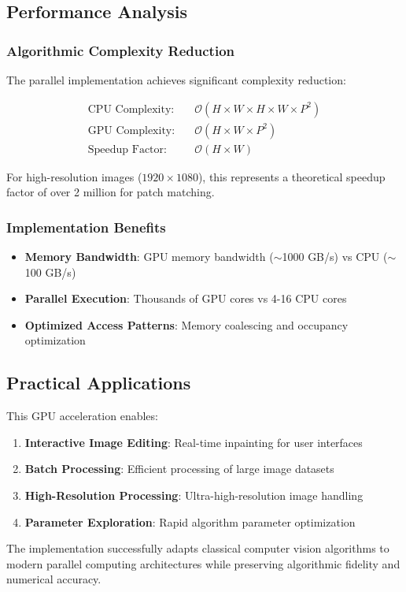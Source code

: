 \documentclass[11pt]{article}
\begin{document}
\subsection{Performance Analysis}

\subsubsection{Algorithmic Complexity Reduction}

The parallel implementation achieves significant complexity reduction:

\begin{align}
\text{CPU Complexity:} &\quad \mathcal{O}(H \times W \times H \times W \times P^2) \\
\text{GPU Complexity:} &\quad \mathcal{O}(H \times W \times P^2) \\  
\text{Speedup Factor:} &\quad \mathcal{O}(H \times W)
\end{align}

For high-resolution images ($1920 \times 1080$), this represents a theoretical speedup factor of over 2 million for patch matching.

\subsubsection{Implementation Benefits}

\begin{itemize}
    \item \textbf{Memory Bandwidth}: GPU memory bandwidth ($\sim$1000 GB/s) vs CPU ($\sim$100 GB/s)
    \item \textbf{Parallel Execution}: Thousands of GPU cores vs 4-16 CPU cores
    \item \textbf{Optimized Access Patterns}: Memory coalescing and occupancy optimization
\end{itemize}

\subsection{Practical Applications}

This GPU acceleration enables:

\begin{enumerate}
    \item \textbf{Interactive Image Editing}: Real-time inpainting for user interfaces
    \item \textbf{Batch Processing}: Efficient processing of large image datasets  
    \item \textbf{High-Resolution Processing}: Ultra-high-resolution image handling
    \item \textbf{Parameter Exploration}: Rapid algorithm parameter optimization
\end{enumerate}

The implementation successfully adapts classical computer vision algorithms to modern parallel computing architectures while preserving algorithmic fidelity and numerical accuracy.
\end{document}

